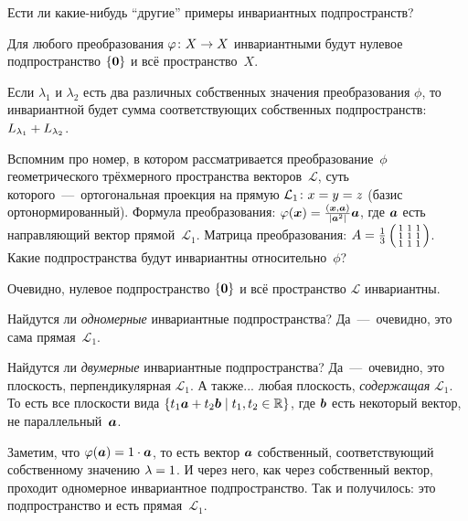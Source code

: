 \documentclass[a4paper,12pt]{article}
\begin{document}
  Ести ли какие-нибудь ``другие'' примеры инвариантных подпространств?
  
  \begin{example}
    Для любого преобразования $\phi\colon X \hm\to X$ инвариантными будут нулевое подпространство $\{\boldsymbol 0\}$ и всё пространство~$X$.
  \end{example}
  
  \begin{example}
    Если $\lambda_1$ и $\lambda_2$ есть два различных собственных значения преобразования $\phi$, то инвариантной будет сумма соответствующих собственных подпространств: $L_{\lambda_1} \hm+ L_{\lambda_2}$.
  \end{example}
  
  \begin{example}
    Вспомним про номер, в котором рассматривается преобразование~$\phi$ геометрического трёхмерного пространства векторов~$\mathcal L$, суть которого~---~ортогональная проекция на прямую $\mathcal L_1\colon x \hm= y \hm= z$ (базис ортонормированный).
    Формула преобразования:
    $
      \phi(\bds x) \hm= \frac{(\bds x, \bds a)}{|\bds a^2|} \bds a
    $,
    где $\boldsymbol a$ есть направляющий вектор прямой~$\mathcal L_1$.
    Матрица преобразования: $A \hm= \frac{1}{3} \left(\begin{smallmatrix}
      1 & 1 & 1\\
      1 & 1 & 1\\
      1 & 1 & 1
    \end{smallmatrix}\right)$.
    Какие подпространства будут инвариантны относительно~$\phi$?
    
    Очевидно, нулевое подпространство $\{\boldsymbol 0\}$ и всё пространство $\mathcal L$ инвариантны.
    
    Найдутся ли \emph{одномерные} инвариантные подпространства?
    Да~---~очевидно, это сама прямая~$\mathcal L_1$.
    
    Найдутся ли \emph{двумерные} инвариантные подпространства?
    Да~---~очевидно, это плоскость, перпендикулярная $\mathcal L_1$.
    А также... любая плоскость, \emph{содержащая} $\mathcal L_1$.
    То есть все плоскости вида $\{t_1 \bds a \hm+ t_2 \bds b \hm\mid t_1, t_2 \hm\in \RR\}$, где $\boldsymbol b$ есть некоторый вектор, не параллельный~$\boldsymbol a$.
    
    Заметим, что
    $
      \phi(\bds a) \hm= 1 \cdot \bds a
    $,
    то есть вектор $\boldsymbol a$ собственный, соответствующий собственному значению $\lambda \hm= 1$.
    И через него, как через собственный вектор, проходит одномерное инвариантное подпространство.
    Так и получилось: это подпространство и есть прямая~$\mathcal L_1$.
  \end{example}
  
\end{document}
